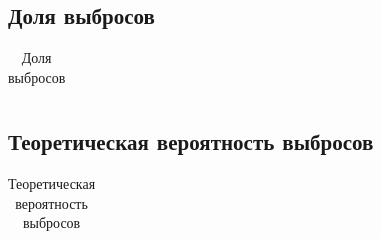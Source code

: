 \documentclass[a4paper]{article}
\begin{document}
\subsection{Доля выбросов}
\begin{table}[H]
    \centering
    \begin{tabular}{|C{2.6 cm}|C{2.6 cm}|C{2.6 cm}|}
        \hline
        
    \end{tabular}
    \caption{Доля выбросов}
    \label{tab:outlierstests}
\end{table}
\subsection{Теоретическая вероятность выбросов}
\begin{table}[H]
    \centering
    \begin{tabular}{|c|c|c|c|c|c|}
        \hline
        
    \end{tabular}
    \caption{Теоретическая вероятность выбросов}
    \label{tab:outlierstheory}
\end{table}
\end{document}
